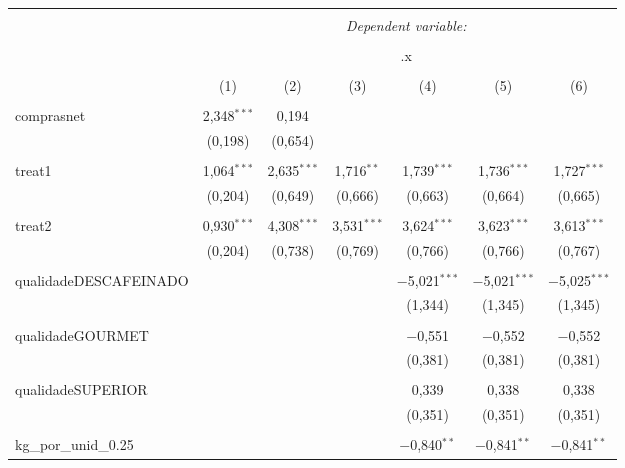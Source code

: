 
\begin{table}[!htbp] \centering 
  \caption{} 
  \label{} 
\begin{tabular}{@{\extracolsep{5pt}}lcccccc} 
\\[-1.8ex]\hline 
\hline \\[-1.8ex] 
 & \multicolumn{6}{c}{\textit{Dependent variable:}} \\ 
\cline{2-7} 
\\[-1.8ex] & \multicolumn{6}{c}{.x} \\ 
\\[-1.8ex] & (1) & (2) & (3) & (4) & (5) & (6)\\ 
\hline \\[-1.8ex] 
 comprasnet & 2,348$^{***}$ & 0,194 &  &  &  &  \\ 
  & (0,198) & (0,654) &  &  &  &  \\ 
  & & & & & & \\ 
 treat1 & 1,064$^{***}$ & 2,635$^{***}$ & 1,716$^{**}$ & 1,739$^{***}$ & 1,736$^{***}$ & 1,727$^{***}$ \\ 
  & (0,204) & (0,649) & (0,666) & (0,663) & (0,664) & (0,665) \\ 
  & & & & & & \\ 
 treat2 & 0,930$^{***}$ & 4,308$^{***}$ & 3,531$^{***}$ & 3,624$^{***}$ & 3,623$^{***}$ & 3,613$^{***}$ \\ 
  & (0,204) & (0,738) & (0,769) & (0,766) & (0,766) & (0,767) \\ 
  & & & & & & \\ 
 qualidadeDESCAFEINADO &  &  &  & $-$5,021$^{***}$ & $-$5,021$^{***}$ & $-$5,025$^{***}$ \\ 
  &  &  &  & (1,344) & (1,345) & (1,345) \\ 
  & & & & & & \\ 
 qualidadeGOURMET &  &  &  & $-$0,551 & $-$0,552 & $-$0,552 \\ 
  &  &  &  & (0,381) & (0,381) & (0,381) \\ 
  & & & & & & \\ 
 qualidadeSUPERIOR &  &  &  & 0,339 & 0,338 & 0,338 \\ 
  &  &  &  & (0,351) & (0,351) & (0,351) \\ 
  & & & & & & \\ 
 kg\_por\_unid\_0.25 &  &  &  & $-$0,840$^{**}$ & $-$0,841$^{**}$ & $-$0,841$^{**}$ \\ 

\end{tabular}
\end{table}
